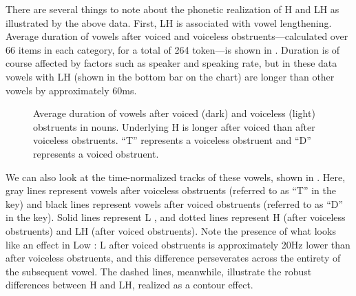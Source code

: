 \documentclass[output=paper,newtxmath,modfonts,nonflat,hidelinks]{langsci/langscibook}
\begin{document}
There are several things to note about the phonetic realization of H and LH as illustrated by the above data. First, LH  is associated with vowel lengthening. Average duration of vowels after voiced and voiceless obstruents—calculated over 66 items in each category, for a total of 264 token—is shown in . Duration is of course affected by factors such as speaker and speaking rate, but in these data vowels with LH  (shown in the bottom bar on the chart) are longer than other vowels by approximately 60ms.


\begin{figure} 
\caption{\label{fig:lotven:3} Average duration of vowels after voiced (dark) and voiceless (light) obstruents in nouns. Underlying H is longer after voiced than after voiceless obstruents. “T” represents a voiceless obstruent and “D” represents a voiced obstruent.}
\end{figure}


We can also look at the time-normalized  tracks of these vowels, shown in . Here, gray lines represent vowels after voiceless obstruents (referred to as “T” in the key) and black lines represent vowels after voiced obstruents (referred to as “D” in the key). Solid lines represent L , and dotted lines represent H (after voiceless obstruents) and LH (after voiced obstruents). Note the presence of what looks like an   effect in Low : L after voiced obstruents is approximately 20Hz lower than after voiceless obstruents, and this difference perseverates across the entirety of the subsequent vowel. The dashed lines, meanwhile, illustrate the robust  differences between H and LH, realized as a contour effect. 
\end{document}
